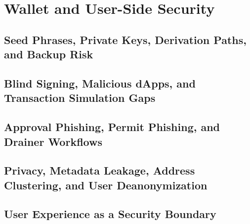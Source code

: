 \chapter{Wallet and User-Side Security}

\section{Seed Phrases, Private Keys, Derivation Paths, and Backup Risk}

\section{Blind Signing, Malicious dApps, and Transaction Simulation Gaps}

\section{Approval Phishing, Permit Phishing, and Drainer Workflows}

\section{Privacy, Metadata Leakage, Address Clustering, and User Deanonymization}

\section{User Experience as a Security Boundary}
